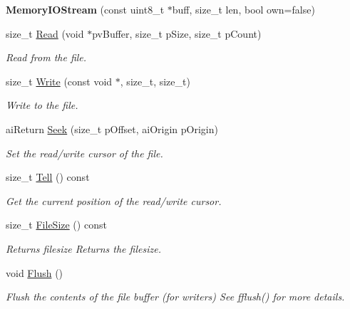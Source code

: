 \begin{DoxyCompactItemize}
\item 
\hypertarget{class_assimp_1_1_memory_i_o_stream_af81cb12d71d2870eb5806e02a0ac05c4}{{\bfseries Memory\+I\+O\+Stream} (const uint8\+\_\+t $\ast$buff, size\+\_\+t len, bool own=false)}\label{class_assimp_1_1_memory_i_o_stream_af81cb12d71d2870eb5806e02a0ac05c4}

\item 
size\+\_\+t \hyperlink{class_assimp_1_1_memory_i_o_stream_aa5d0cb047478d3e6f3011286d0c300c5}{Read} (void $\ast$pv\+Buffer, size\+\_\+t p\+Size, size\+\_\+t p\+Count)
\begin{DoxyCompactList}\small\item\em Read from the file. \end{DoxyCompactList}\item 
size\+\_\+t \hyperlink{class_assimp_1_1_memory_i_o_stream_a9ac5af341c3ed61137313264e1b5f964}{Write} (const void $\ast$, size\+\_\+t, size\+\_\+t)
\begin{DoxyCompactList}\small\item\em Write to the file. \end{DoxyCompactList}\item 
ai\+Return \hyperlink{class_assimp_1_1_memory_i_o_stream_af81316ae35d6dd6b09a35a7591c0e96e}{Seek} (size\+\_\+t p\+Offset, ai\+Origin p\+Origin)
\begin{DoxyCompactList}\small\item\em Set the read/write cursor of the file. \end{DoxyCompactList}\item 
size\+\_\+t \hyperlink{class_assimp_1_1_memory_i_o_stream_a3e4ca39091e79247a137c7ce09198e02}{Tell} () const 
\begin{DoxyCompactList}\small\item\em Get the current position of the read/write cursor. \end{DoxyCompactList}\item 
\hypertarget{class_assimp_1_1_memory_i_o_stream_ac66735913b25a5e8bd91a39169637e8e}{size\+\_\+t \hyperlink{class_assimp_1_1_memory_i_o_stream_ac66735913b25a5e8bd91a39169637e8e}{File\+Size} () const }\label{class_assimp_1_1_memory_i_o_stream_ac66735913b25a5e8bd91a39169637e8e}

\begin{DoxyCompactList}\small\item\em Returns filesize Returns the filesize. \end{DoxyCompactList}\item 
\hypertarget{class_assimp_1_1_memory_i_o_stream_aae4a10484dbad0604f7663dcaac94055}{void \hyperlink{class_assimp_1_1_memory_i_o_stream_aae4a10484dbad0604f7663dcaac94055}{Flush} ()}\label{class_assimp_1_1_memory_i_o_stream_aae4a10484dbad0604f7663dcaac94055}

\begin{DoxyCompactList}\small\item\em Flush the contents of the file buffer (for writers) See fflush() for more details. \end{DoxyCompactList}\end{DoxyCompactItemize}
